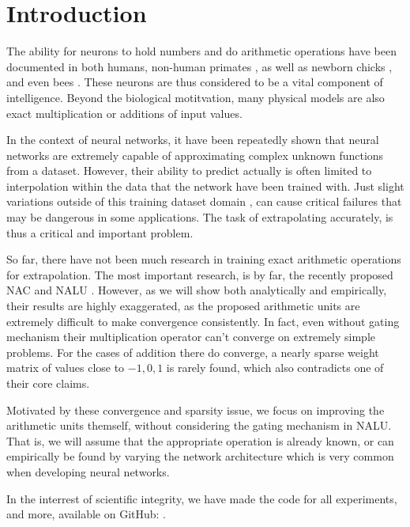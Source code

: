 \section{Introduction}

The ability for neurons to hold numbers and do arithmetic operations have been documented in both humans, non-human primates \cite{nieder-neuronal-number}, as well as newborn chicks \cite{rugani-arithmetic-chicks}, and even bees \cite{gallistel-numbers-in-brain}. These neurons are thus considered to be a vital
component of intelligence. Beyond the biological motitvation, many physical models are also exact multiplication or additions of input values.

In the context of neural networks, it have been repeatedly shown that neural networks are extremely capable of approximating complex unknown functions from a dataset. However, their ability to predict actually is often limited to interpolation within the data that the network have been trained with. Just slight variations outside of this training dataset domain \cite{missing-cite:image-with-modification}, can cause critical failures that may be dangerous in some applications. The task of extrapolating accurately, is thus a critical and important problem.

So far, there have not been much research in training exact arithmetic operations for extrapolation. The most important research, is by far, the recently proposed NAC and NALU \cite{trask-nalu}. However, as we will show both analytically and empirically, their results are highly exaggerated, as the proposed arithmetic units are extremely difficult to make convergence consistently. In fact, even without gating mechanism their multiplication operator can't converge on extremely simple problems. For the cases of addition there do converge, a nearly sparse weight matrix of values close to ${-1, 0, 1}$ is rarely found, which also contradicts one of their core claims.

Motivated by these convergence and sparsity issue, we focus on improving the arithmetic units themself, without considering the gating mechanism in NALU. That is, we will assume that the appropriate operation is already known, or can empirically be found by varying the network architecture which is very common when developing neural networks.

In the interrest of scientific integrity, we have made the code for all experiments, and more, available on GitHub: . 

